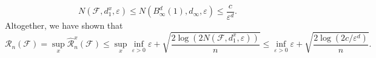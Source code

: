 \begin{example}
\[
    N(\mathcal{F}, d_1^x, \varepsilon) \leq N(B_{\infty}^d(1), d_{\infty}, \varepsilon) \leq \frac{c}{\varepsilon^d}.
\]
Altogether, we have shown that
\[
    \mathcal{R}_n(\mathcal{F}) = \sup_x \hat{\mathcal{R}}_n^x(\mathcal{F}) \leq \sup_x \inf_{\varepsilon > 0} \varepsilon + \sqrt{\frac{2 \log(2 N(\mathcal{F}, d_1^x, \varepsilon))}{n}} \leq \inf_{\varepsilon > 0} \varepsilon + \sqrt{\frac{2 \log(2c / \varepsilon^d)}{n}}.
\]
\end{example}
